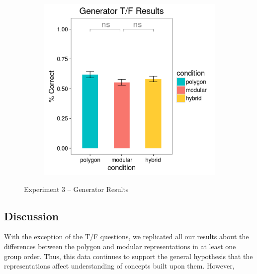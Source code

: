\documentclass[11pt]{article}
\begin{document}
\begin{figure}[H]
\begin{subfigure}[c]{0.4\textwidth}
\includegraphics[width=\textwidth]{figures/3/gen_TF_r.png}
\end{subfigure}
\caption{Experiment 3 -- Generator Results}
\label{ex3_gen}
\end{figure}\noindent 
\subsection{Discussion}
With the exception of the T/F questions, we replicated all our results about the differences between the polygon and modular representations in at least one group order. Thus, this data continues to support the general hypothesis that the representations affect understanding of concepts built upon them. However, %
\end{document}
